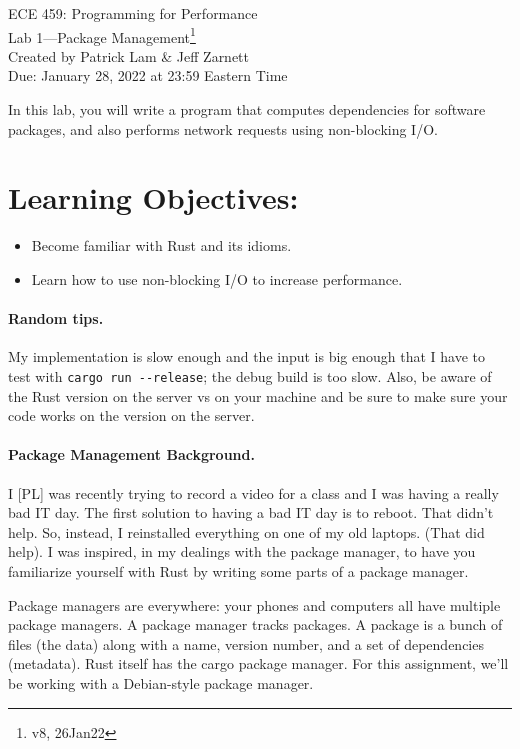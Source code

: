 \documentclass[12pt]{article}
\renewcommand{\_}{\kern-1.5pt\textunderscore\kern-1.5pt}
\begin{document}
\begin{center}
{\Large ECE 459: Programming for Performance}\\
{\Large Lab 1---Package Management\footnote{v8, 26Jan22}}\\[1em]
Created by Patrick Lam \& Jeff Zarnett\\
Due: January 28, 2022 at 23:59 Eastern Time
\end{center}


\vspace{1em}
In this lab, you will write a program that computes dependencies for software packages, and also performs network requests using non-blocking I/O.

\section*{Learning Objectives:}
\begin{itemize}
	\item Become familiar with Rust and its idioms.
	\item Learn how to use non-blocking I/O to increase performance.
\end{itemize}

\paragraph*{Random tips.} My implementation is slow enough and the input is big enough that I have to test with \verb+cargo run --release+; the debug build is too slow. Also, be aware of the Rust version on the server vs on your machine and be sure to make sure your code works on the version on the server.


\paragraph*{Package Management Background.}
I [PL] was recently trying to record a video for a class and I was having a really bad IT day. The first solution to having a bad IT day is to reboot. That didn't help. So, instead, I reinstalled everything on one of my old laptops. (That did help). I was inspired, in my dealings with the package manager, to have you familiarize yourself with Rust by writing some parts of a package manager. \par

\vspace{1em}
Package managers are everywhere: your phones and computers all have multiple package managers. A package manager tracks packages. A package is a bunch of files (the data) along with a name, version number, and a set of dependencies (metadata). Rust itself has the cargo package manager. For this assignment, we'll be working with a Debian-style package manager. \par
\end{document}
